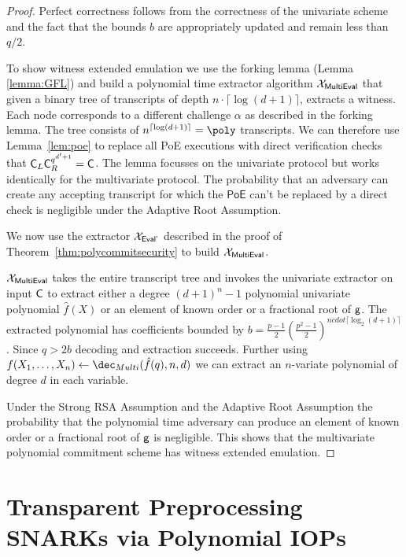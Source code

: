 \documentclass{article}
\theoremstyle{definition}
\begin{document}
\begin{proof}
	Perfect correctness follows from the correctness of the univariate scheme and the fact that the bounds $b$ are appropriately updated and remain less than $q/2$.
	
	To show witness extended emulation we use the forking lemma (Lemma \ref{lemma:GFL}) and build a polynomial time extractor algorithm $\mathcal{X}_{\textsf{{MultiEval}}}$ that given a binary tree of transcripts of depth $n \cdot\lceil\log(d+1)\rceil$, extracts a witness. Each node corresponds to a different challenge $\alpha$ as described in the forking lemma. The tree consists of $n^{\lceil\log(d+1)\rceil}=\poly$ transcripts. 
We can therefore use Lemma~\ref{lem:poe} to replace all \textsf{PoE} executions with direct verification checks that $\mathsf{C}_L\mathsf{C}_R^{q^{d'+1}}=\mathsf{C}$. The lemma focusses on the univariate  protocol but works identically for the multivariate protocol. The probability that an adversary can create any accepting transcript for which the $\textsf{PoE}$ can't be replaced by a direct check is negligible under the Adaptive Root Assumption.

	We now use the extractor $\mathcal{X}_{\textsf{{Eval'}}}$ described in the proof of Theorem~\ref{thm:polycommitsecurity} to build $\mathcal{X}_{\textsf{{MultiEval}}}$. 
	
	$\mathcal{X}_{\textsf{{MultiEval}}}$ takes the entire transcript tree and invokes the univariate extractor on input $\mathsf{C}$ to extract either a degree $(d+1)^n-1$ polynomial univariate polynomial $\hat{f}(X)$ or an element of known order or a fractional root of $\mathsf{g}$. The extracted polynomial has coefficients bounded by $b=\frac{p-1}{2}(\frac{p^2-1}{2})^{n
	cdot \lceil\log_2(d+1)\rceil}$. Since $q>2b$ decoding and extraction succeeds. Further using $f(X_1,\dots,X_n)\gets\dec_{Multi}(\hat{f}(q),n,d)$ we can extract an $n$-variate polynomial of degree $d$ in each variable. 
	
	Under the Strong RSA Assumption and the Adaptive Root Assumption the probability that the polynomial time adversary can produce an element of known order or a fractional root of $\mathsf{g}$ is negligible. This shows that the multivariate polynomial commitment scheme has witness extended emulation.
\end{proof}




\section{Transparent Preprocessing SNARKs via Polynomial IOPs}\label{sec:polyiop}

\end{document}
